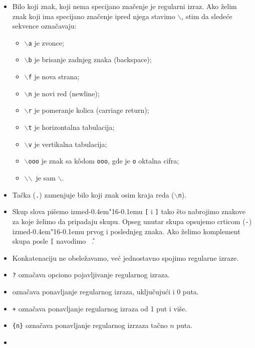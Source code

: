 \documentclass[12pt,a4paper]{article}
\def\d{d\kern-0.4em\char"16\kern-0.1em}
\def\bs{$\backslash$}
\begin{document}
      \begin{itemize}
      \item
        Bilo koji znak, koji nema specijano zna\v cenje je regularni izraz.
        Ako \v zelim znak koji ima specijano zna\v cenje ipred njega stavimo
        {\tt\bs}, stim da slede\'ce sekvence ozna\v cavaju:
        \begin{itemize}
        \item
          {\tt\bs a} je zvonce;
        \item
          {\tt\bs b} je brisanje zadnjeg znaka (backspace);
        \item
          {\tt\bs f} je nova strana;
        \item
          {\tt\bs n} je novi red (newline);
        \item
          {\tt\bs r} je pomeranje kolica (carriage return);
        \item
          {\tt\bs t} je horizontalna tabulacija;
        \item
          {\tt\bs v} je vertikalna tabulacija;
        \item
          {\tt\bs ooo} je znak sa k\^odom {\tt ooo}, gde je {\tt o} oktalna
          cifra;
        \item
          \bs\bs\ je sam \bs.
        \end{itemize}
      \item
        Ta\v cka ({\tt.}) zamenjuje bilo koji znak osim kraja reda
        ({\tt\bs n}).
      \item
        Skup slova pi\v semo izme\d u {\tt[} i {\tt]} tako \v sto nabrojimo
        znakove za koje \v zelimo da pripadaju skupu.
        Opseg unutar skupa opsujemo crticom ({\tt-}) izme\d u prvog i
        poslednjeg znaka.
        Ako \v zelimo komplement skupa posle {\tt[} navodimo {\tt\^\ }.
      \item
        Konkatenaciju ne obele\v zavamo, ve\'c jednostavno spojimo regularne
        iz\-raze.
      \item
        {\tt?} ozna\v cava opciono pojavljivanje regularnog izraza.
      \item
        {\tt*} ozna\v cava ponavljanje regularnog izraza, uklju\v cuju\'ci i
        0 puta.
      \item
        {\tt+} ozna\v cava ponavljanje regularnog izraza od 1 put i vi\v se.
      \item
        {\tt\{n\}} ozna\v cava ponavljanje regularnog izrzaza ta\v cno $n$
        puta.
      \item

\end{itemize}
\end{document}
